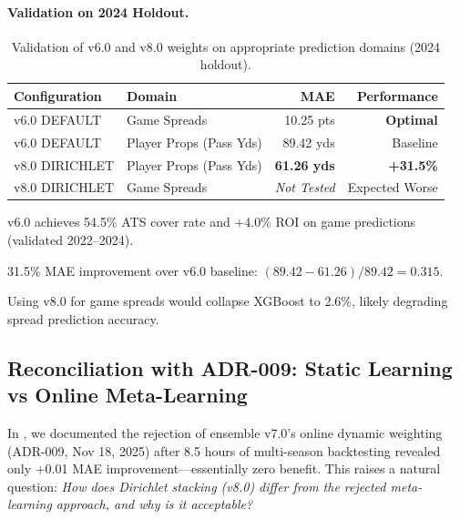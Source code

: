 \paragraph{Validation on 2024 Holdout.}
\begin{table}[h]
\centering
\caption[Dual-weight validation performance]{Validation of v6.0 and v8.0 weights on appropriate prediction domains (2024 holdout).}
\label{tab:dual-weight-validation}
\begin{threeparttable}
\begin{tabular}{@{}llrr@{}}
\toprule
\textbf{Configuration} & \textbf{Domain} & \textbf{MAE} & \textbf{Performance} \\
\midrule
v6.0 DEFAULT & Game Spreads & 10.25 pts & \textbf{Optimal}\tnote{a} \\
v6.0 DEFAULT & Player Props (Pass Yds) & 89.42 yds & Baseline \\
v8.0 DIRICHLET & Player Props (Pass Yds) & \textbf{61.26 yds} & \textbf{+31.5\%}\tnote{b} \\
v8.0 DIRICHLET & Game Spreads & \textit{Not Tested}\tnote{c} & Expected Worse \\
\bottomrule
\end{tabular}
\begin{tablenotes}
\footnotesize
\item[a] v6.0 achieves 54.5\% ATS cover rate and +4.0\% ROI on game predictions (validated 2022--2024).
\item[b] 31.5\% MAE improvement over v6.0 baseline: $(89.42 - 61.26) / 89.42 = 0.315$.
\item[c] Using v8.0 for game spreads would collapse XGBoost to 2.6\%, likely degrading spread prediction accuracy.
\end{tablenotes}
\end{threeparttable}
\end{table}

\subsection{Reconciliation with ADR-009: Static Learning vs Online Meta-Learning}
\label{subsec:reconcile-adr009}

In , we documented the rejection of ensemble v7.0's online dynamic weighting (ADR-009, Nov 18, 2025) after 8.5 hours of multi-season backtesting revealed only +0.01 MAE improvement---essentially zero benefit. This raises a natural question: \emph{How does Dirichlet stacking (v8.0) differ from the rejected meta-learning approach, and why is it acceptable?}


